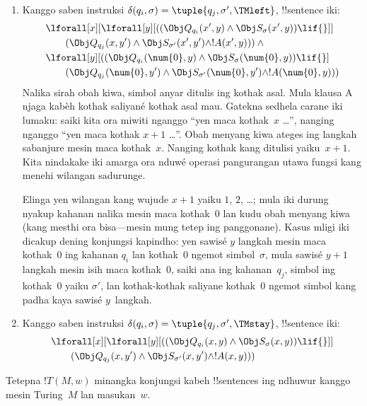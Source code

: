 \documentclass[../../../include/open-logic-section]{subfiles}
\begin{document}
\begin{enumerate}
\begin{enumerate}
\item {} Kanggo saben instruksi $\delta(q_i, \sigma) =
  \tuple{q_j, \sigma', \TMleft}$, !!{sentence} iki:
\begin{align*}
& \lforall[x][\lforall[y][
    ((\Obj Q_{q_i}(x', y) \land \Obj S_{\sigma}(x', y)) \lif {}]]\\
& \qquad   (\Obj Q_{q_j}(x, y') \land \Obj S_{\sigma'}(x', y') \land
!A(x', y))) \land {}\\
& \lforall[y][((\Obj Q_{q_i}(\num{0}, y) \land \Obj S_{\sigma}(\num{0},
    y)) \lif {}]\\
& \qquad (\Obj Q_{q_j}(\num{0}, y') \land \Obj S_{\sigma'}(\num{0},
  y') \land !A(\num{0}, y)))
\end{align*}
Nalika sirah obah kiwa, simbol anyar ditulis ing kothak asal. Mula klausa A njaga kabèh kothak saliyané kothak asal mau. Gatekna sedhela carane iki lumaku: saiki kita
ora miwiti nganggo ``yen maca kothak~$x$ \dots'',
nanging nganggo ``yen maca kothak $x+1$ \dots''.
Obah menyang kiwa ateges ing langkah sabanjure
mesin maca kothak~$x$. Nanging kothak kang
ditulisi yaiku~$x+1$. Kita nindakake iki
amarga ora nduwé operasi pangurangan utawa
fungsi kang menehi wilangan sadurunge.

Elinga yen wilangan kang wujude $x+1$ yaiku
$1$, $2$, \dots; mula iki durung nyakup
kahanan nalika mesin maca kothak~$0$ lan
kudu obah menyang kiwa (kang mesthi ora
bisa---mesin mung tetep ing panggonane).
Kasus mligi iki dicakup dening konjungsi
kapindho: yen sawisé $y$ langkah mesin
maca kothak~$0$ ing kahanan $q_i$ lan
kothak~$0$ ngemot simbol~$\sigma$,
mula sawisé $y+1$ langkah mesin isih
maca kothak~$0$, saiki ana ing kahanan~$q_j$,
simbol ing kothak~$0$ yaiku $\sigma'$,
lan kothak-kothak saliyane kothak~$0$
ngemot simbol kang padha kaya sawisé
$y$~langkah.
\item {} Kanggo saben instruksi $\delta(q_i, \sigma) =
  \tuple{q_j, \sigma', \TMstay}$, !!{sentence} iki:
\begin{align*}
& \lforall[x][\lforall[y][(
   (\Obj Q_{q_i}(x, y) \land \Obj S_{\sigma}(x, y)) \lif {}]] \\
&\qquad   (\Obj Q_{q_j}(x, y') \land \Obj S_{\sigma'}(x, y') \land
!A(x, y)))
\end{align*}
\end{enumerate}
\end{enumerate}
Tetepna $!T(M, w)$ minangka konjungsi kabeh
!!{sentence}s ing ndhuwur kanggo mesin Turing~$M$
lan masukan~$w$.
\end{document}
